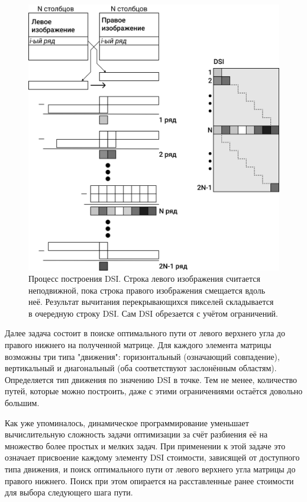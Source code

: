 \begin{figure}[H]
	\begin{center}
		\includegraphics[scale=0.04]{pics/DSI_rus.png}
		\caption{Процесс построения DSI. Строка левого изображения считается неподвижной, пока строка правого изображения смещается вдоль неё. Результат вычитания 
				 перекрывающихся пикселей складывается в очередную строку DSI. Сам DSI обрезается с учётом ограничений.	} 
		\label{pic:DSI} %
	\end{center}
\end{figure}
Далее задача состоит в поиске оптимального пути от левого верхнего угла до правого нижнего на полученной матрице. Для каждого элемента матрицы возможны три типа "движения": горизонтальный (означающий совпадение),
 вертикальный и диагональный (оба соответствуют заслонённым областям). Определяется тип движения по значению DSI в точке. Тем не менее, количество путей, которые можно построить, даже с этими ограничениями 
 остаётся довольно большим.

 Как уже упоминалось, динамическое программирование уменьшает вычислительную сложность задачи оптимизации   за счёт разбиения её на множество более простых и мелких задач. 
При применении к этой задаче это означает присвоение каждому элементу DSI стоимости, зависящей от доступного типа движения, и поиск оптимального пути от левого верхнего угла 
матрицы до правого нижнего. Поиск при этом опирается на расставленные ранее стоимости для выбора следующего шага пути. 

